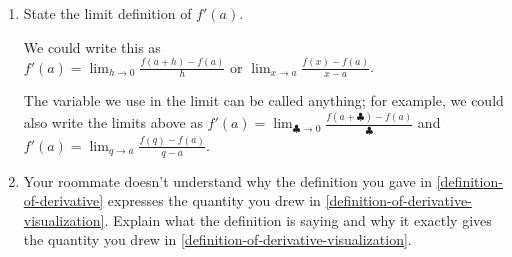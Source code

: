 \documentclass{article}
\theoremstyle{theorem}
\begin{document}
\begin{enumerate}
\begin{enumerate}
\begin{problem}[\vfill]
    \end{problem}

    \begin{solution}
      $f'(a)$ is the slope of the tangent line at $x = a$; that is, it's
      the slope of the red line shown above.
    \end{solution}

  \item \label{definition-of-derivative}
    \begin{problem}[\vfill]
      State the limit definition of $f'(a)$.
    \end{problem}

    \begin{solution}
      We could write this as $f'(a) = \boxed{ \lim_{h \to 0} \frac{f(a + h) - f(a)}{h} \text{ or } \lim_{x \to a} \frac{f(x) - f(a)}{x - a}}$.

      The variable we use in the limit can be called anything; for example, we could also write the limits above as $f'(a) = \displaystyle \lim_{\clubsuit \to 0} \frac{f(a + \clubsuit) - f(a)}{\clubsuit}$ and $f'(a) = \displaystyle \lim_{q \to a} \frac{f(q) - f(a)}{q - a}$. 
    \end{solution}

  \item
    \begin{problem}[\nstretch{4}]
      Your roommate doesn't understand why the definition you gave in
      \ref{definition-of-derivative} expresses the quantity you drew in
      \ref{definition-of-derivative-visualization}.  Explain what the
      definition is saying and why it exactly gives the quantity you drew
      in \ref{definition-of-derivative-visualization}.
    \end{problem}


\end{enumerate}
\end{enumerate}
\end{document}
